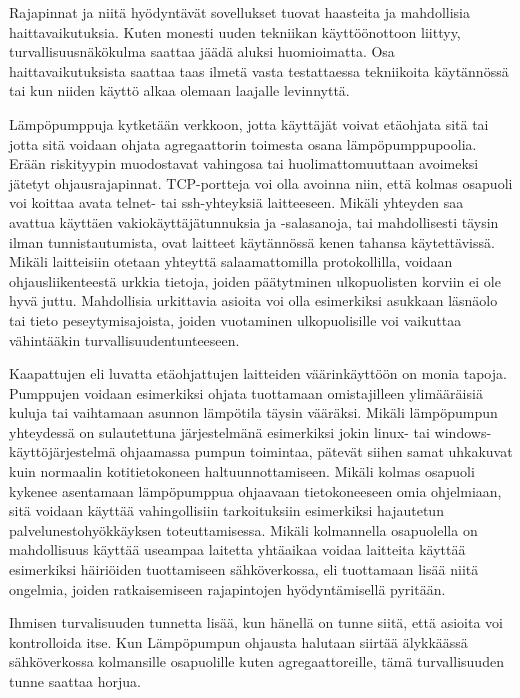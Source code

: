   Rajapinnat ja niitä hyödyntävät sovellukset tuovat haasteita ja mahdollisia haittavaikutuksia. Kuten monesti uuden tekniikan käyttöönottoon liittyy, turvallisuusnäkökulma saattaa jäädä aluksi huomioimatta. Osa haittavaikutuksista saattaa taas ilmetä vasta testattaessa tekniikoita käytännössä tai kun niiden käyttö alkaa olemaan laajalle levinnyttä.

  Lämpöpumppuja kytketään verkkoon, jotta käyttäjät voivat etäohjata sitä tai jotta sitä voidaan ohjata agregaattorin toimesta osana lämpöpumppupoolia. Erään riskityypin muodostavat vahingosa tai huolimattomuuttaan avoimeksi jätetyt ohjausrajapinnat. TCP-portteja voi olla avoinna niin, että kolmas osapuoli voi koittaa avata telnet- tai ssh-yhteyksiä laitteeseen. Mikäli yhteyden saa avattua käyttäen vakiokäyttäjätunnuksia ja -salasanoja,  tai mahdollisesti täysin ilman tunnistautumista, ovat laitteet käytännössä kenen tahansa käytettävissä. Mikäli laitteisiin otetaan yhteyttä salaamattomilla protokollilla, voidaan ohjausliikenteestä urkkia tietoja, joiden päätytminen ulkopuolisten korviin ei ole hyvä juttu. Mahdollisia urkittavia asioita voi olla esimerkiksi asukkaan läsnäolo tai tieto peseytymisajoista, joiden vuotaminen ulkopuolisille voi vaikuttaa vähintääkin turvallisuudentunteeseen.

  Kaapattujen eli luvatta etäohjattujen laitteiden väärinkäyttöön on monia tapoja. Pumppujen voidaan esimerkiksi ohjata tuottamaan omistajilleen ylimääräisiä kuluja tai vaihtamaan asunnon lämpötila täysin vääräksi. Mikäli lämpöpumpun yhteydessä on sulautettuna järjestelmänä esimerkiksi jokin linux- tai windows-käyttöjärjestelmä ohjaamassa pumpun toimintaa, pätevät siihen samat uhkakuvat kuin normaalin kotitietokoneen haltuunnottamiseen. Mikäli kolmas osapuoli kykenee asentamaan lämpöpumppua ohjaavaan tietokoneeseen omia ohjelmiaan, sitä voidaan käyttää vahingollisiin tarkoituksiin esimerkiksi hajautetun palvelunestohyökkäyksen toteuttamisessa. Mikäli kolmannella osapuolella on mahdollisuus käyttää useampaa laitetta yhtäaikaa voidaa laitteita käyttää esimerkiksi häiriöiden tuottamiseen sähköverkossa, eli tuottamaan lisää niitä ongelmia, joiden ratkaisemiseen rajapintojen hyödyntämisellä pyritään.

  Ihmisen turvalisuuden tunnetta lisää, kun hänellä on tunne siitä, että asioita voi kontrolloida itse. Kun Lämpöpumpun ohjausta halutaan siirtää älykkäässä sähköverkossa kolmansille osapuolille kuten agregaattoreille, tämä turvallisuuden tunne saattaa horjua.
